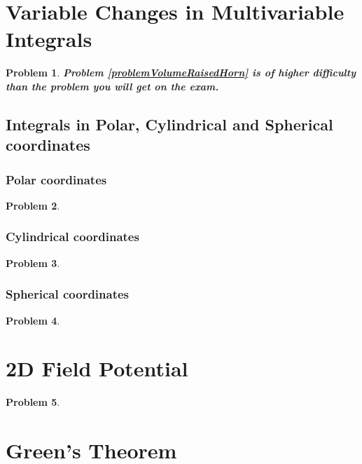\documentclass{article}
\newtheorem{problem}{Problem}
\begin{document}
\section{Variable Changes in Multivariable Integrals}
\begin{problem}
\textbf{Problem \ref{problemVolumeRaisedHorn} is of higher difficulty than the problem you will get on the exam.}


\end{problem}


\subsection{Integrals in Polar, Cylindrical and Spherical coordinates}
\subsubsection{Polar coordinates}
\begin{problem}

\end{problem}
\subsubsection{Cylindrical coordinates}
\begin{problem}

\end{problem}
\subsubsection{Spherical coordinates}
\begin{problem}

\end{problem}
\section{2D Field Potential}
\begin{problem}

\end{problem}
\section{Green's Theorem}
\end{document}
